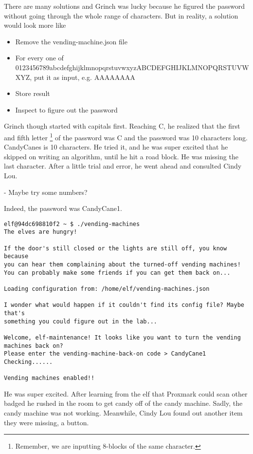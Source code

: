 There are many solutions and Grinch was lucky because he figured the password without going through the whole range of characters.
But in reality, a solution would look more like
\begin{itemize}
  \item Remove the vending-machine.json file
  \item For every one of 0123456789abcdefghijklmnopqrstuvwxyzABCDEFGHIJKLMNOPQRSTUVWXYZ, put it as input, e.g. AAAAAAAA
  \item Store result
  \item Inspect to figure out the password
\end{itemize}

Grinch though started with capitals first. Reaching C, he realized that the first and fifth letter \footnote{Remember, we are inputting 8-blocks of the same character.} of the password was C and the password was 10 characters long.
CandyCanes is 10 characters. He tried it, and he was super excited that he skipped on writing an algorithm, until he hit a road block. He was missing the last character. After a little trial and error, he went ahead and consulted Cindy Lou.

- Maybe try some numbers?

Indeed, the password was CandyCane1.

\begin{verbatim}
elf@94dc698810f2 ~ $ ./vending-machines
The elves are hungry!

If the door's still closed or the lights are still off, you know because
you can hear them complaining about the turned-off vending machines!
You can probably make some friends if you can get them back on...

Loading configuration from: /home/elf/vending-machines.json

I wonder what would happen if it couldn't find its config file? Maybe that's
something you could figure out in the lab...

Welcome, elf-maintenance! It looks like you want to turn the vending machines back on?
Please enter the vending-machine-back-on code > CandyCane1
Checking......

Vending machines enabled!!
\end{verbatim}

He was super excited. After learning from the elf that Proxmark could scan other badged he rushed in the room to get candy off of the candy machine. Sadly, the candy machine was not working. Meanwhile, Cindy Lou found out another item they were missing, a button.

